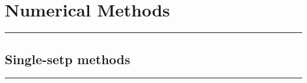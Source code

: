 \section{Numerical Methods}
\noindent\rule[\linienAbstand]{\linewidth}{\linienDickeDick}

\subsection{Single-setp methods}
\noindent\rule[\linienAbstand]{\linewidth}{\linienDicke}
